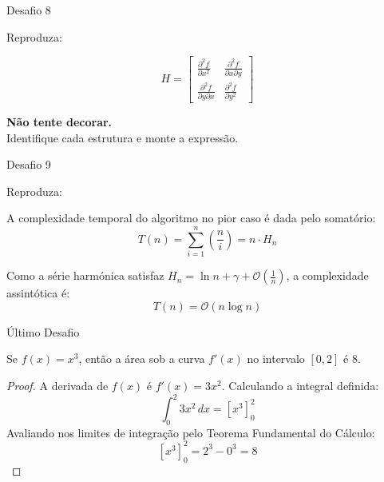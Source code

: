 \documentclass[aspectratio=169,xcolor=dvipsnames]{beamer}
\begin{document}
\begin{frame}{Desafio 8}

    Reproduza:

    \[
        H =
        \begin{bmatrix}
            \frac{\partial^2 f}{\partial x^2} & \frac{\partial^2 f}{\partial x \partial y} \\
            \frac{\partial^2 f}{\partial y \partial x} & \frac{\partial^2 f}{\partial y^2}
        \end{bmatrix}
    \]

    \vspace{0.3cm}

    \begin{center}
        \textbf{Não tente decorar.}\\
        Identifique cada estrutura e monte a expressão.
    \end{center}

\end{frame}

\begin{frame}{Desafio 9}

    Reproduza:

A complexidade temporal do algoritmo no pior caso é dada pelo somatório:
\[
T(n) = \sum_{i=1}^{n} \left( \frac{n}{i} \right) = n \cdot H_n
\]

Como a série harmónica satisfaz $H_n = \ln n + \gamma + \mathcal{O}\left(\frac{1}{n}\right)$, a complexidade assintótica é:
\[
T(n) = \mathcal{O}(n \log n)
\]

    \vspace{0.3cm}


\end{frame}

\begin{frame}[fragile]{Último Desafio}

\begin{theorem}[Teorema 1]
Se $f(x) = x^3$, então a área sob a curva $f'(x)$ no intervalo $[0, 2]$ é $8$.
\end{theorem}

\begin{proof}
A derivada de $f(x)$ é $f'(x) = 3x^2$. Calculando a integral definida:
\[
\int_{0}^{2} 3x^2 \, dx = \left[ x^3 \right]_{0}^{2}
\]
Avaliando nos limites de integração pelo Teorema Fundamental do Cálculo:
\[
\left[ x^3 \right]_{0}^{2} = 2^3 - 0^3 = 8
\]
\end{proof}

\end{frame}
\end{document}
